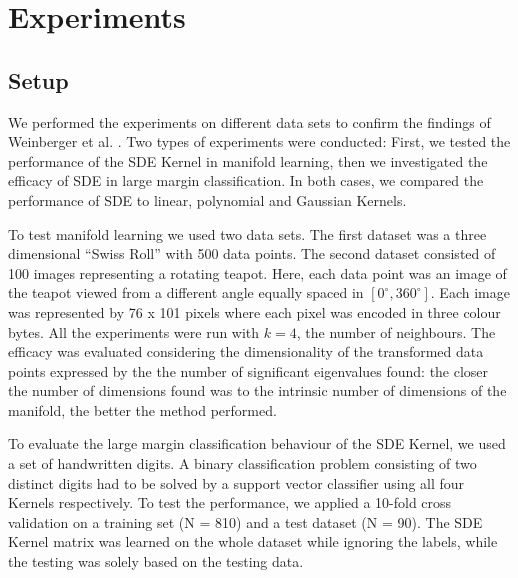 \documentclass[a4paper,12pt]{article}
\begin{document}
\section{Experiments}
\label{sec:exps}



\subsection{Setup}
We performed the experiments on different data sets to confirm the findings of Weinberger et al. \cite{weinberger04}. Two types of experiments were conducted: First, we tested the performance of the SDE Kernel in manifold  learning, then we investigated the efficacy of SDE in large margin classification. In both cases, we compared the performance of SDE to linear, polynomial and Gaussian Kernels.

To test manifold learning we used two data sets. The first dataset was a three dimensional “Swiss Roll” with 500 data points. The second dataset consisted of 100 images representing a rotating teapot. Here, each data point was an image of the teapot viewed from a different angle equally spaced in $[0^{\circ},360^{\circ}]$. Each image was represented by 76 x 101 pixels where each pixel was encoded in three colour bytes. All the experiments were run with $k = 4$, the number of neighbours. The efficacy was evaluated considering the dimensionality of the transformed data points expressed by the the number of significant eigenvalues found: the closer the number of dimensions found was to the intrinsic number of dimensions of the manifold, the better the method performed.

To evaluate the large margin classification behaviour of the SDE Kernel, we used a set of handwritten digits. A binary classification problem consisting of two distinct digits had to be solved by a support vector classifier using all four Kernels respectively. To test the performance, we applied a 10-fold cross validation on a training set (N = 810) and a test dataset (N = 90). The SDE Kernel matrix was learned on the whole dataset while ignoring the labels, while the testing was solely based on the testing data.  


\end{document}

